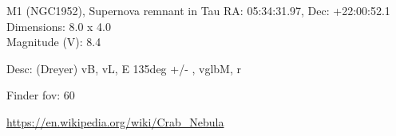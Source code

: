 \begin{block}{M1 (NGC1952), Supernova remnant in Tau}
    RA: 05:34:31.97, Dec: +22:00:52.1 \\ 
    Dimensions: 8.0 x 4.0 \\ 
    Magnitude (V): 8.4


    Desc: (Dreyer) vB, vL, E 135deg +/- , vglbM, r 

    Finder fov: 60 

    \url{https://en.wikipedia.org/wiki/Crab_Nebula} 
\end{block}
